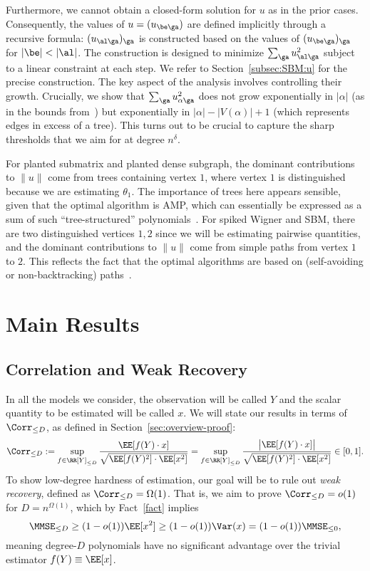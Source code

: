 \documentclass[11pt]{article}
\begin{document}
Furthermore, we cannot obtain a closed-form solution for $u$ as in the prior cases.    Consequently, the values of $u=(u_{\be \ga})$ are defined implicitly through a recursive formula: 
$(u_{\al\ga})_{\ga}$ 
is constructed based on the values of $(u_{\be\ga})_{\ga}$ for $|\be|<|\al|$. The construction is designed to minimize $\sum_{\ga} u_{\al\ga}^2$ subject to a linear constraint at each step. We refer to Section~\ref{subsec:SBM:u} for the precise construction. The key aspect of the analysis involves controlling their growth. Crucially, we show that $\sum_{\ga} u_{\alpha\ga}^2$ does not grow exponentially in $|\alpha|$ (as in the bounds from~\cite{SW-estimation}) but exponentially in $|\alpha|-|V(\alpha)|+1$ (which represents edges in excess of a tree). This turns out to be crucial to capture the sharp thresholds that we aim for at degree $n^\delta$.

For planted submatrix and planted dense subgraph, the dominant contributions to $\|u\|$ come from trees containing vertex $1$, where vertex $1$ is distinguished because we are estimating $\theta_1$. The importance of trees here appears sensible, given that the optimal algorithm is AMP, which can essentially be expressed as a sum of such ``tree-structured'' polynomials~\cite{amp-univ,MW-amp,sos-amp-robustly,fourier-iter,alg-universality}. For spiked Wigner and SBM, there are two distinguished vertices $1,2$ since we will be estimating pairwise quantities, and the dominant contributions to $\|u\|$ come from simple paths from vertex $1$ to $2$. This reflects the fact that the optimal algorithms are based on (self-avoiding or non-backtracking) paths~\cite{spectral-redemption,massoulie,nb-spectrum,HS-bayesian}.





\section{Main Results}
\label{sec:main-results}


\subsection{Correlation and Weak Recovery}
\label{sec:corr}

In all the models we consider, the observation will be called $Y$ and the scalar quantity to be estimated will be called $x$. We will state our results in terms of $\Corr_{\le D}$, as defined in Section~\ref{sec:overview-proof}:
\[ \Corr_{\le D} := \sup_{f \in \RR[Y]_{\le D}} \frac{\EE[f(Y) \cdot x]}{\sqrt{\EE[f(Y)^2] \cdot \EE[x^2]}}=\sup_{f \in \RR[Y]_{\le D}} \frac{\big|\EE[f(Y) \cdot x]\big|}{\sqrt{\EE[f(Y)^2] \cdot \EE[x^2]}} \in [0,1]. \]
To show low-degree hardness of estimation, our goal will be to rule out \emph{weak recovery}, defined as $\Corr_{\le D} = \Omega(1)$. That is, we aim to prove $\Corr_{\le D} = o(1)$ for $D=n^{\Omega(1)}$, which by Fact~\ref{fact} implies
\[ \MMSE_{\le D} \ge (1-o(1)) \EE[x^2] \ge (1-o(1)) \Var(x) = (1-o(1)) \MMSE_{\le 0}, \]
meaning degree-$D$ polynomials have no significant advantage over the trivial estimator $f(Y) \equiv \EE[x]$.
\end{document}

